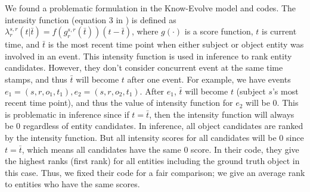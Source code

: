 We found a problematic formulation in the Know-Evolve model and codes.
The intensity function (equation 3 in \citep{Trivedi2017KnowEvolveDT}) is defined as 
$\lambda_r^{s,r}(t|\bar{t})=f(g_r^{s,r}(\bar{t}))(t-\bar{t})$, where $g(\cdot)$ is a score function, $t$ is current time, and $\bar{t}$ is the most recent time point when either subject or object entity was involved in an event.
This intensity function is used in inference to rank entity candidates.
However, they don't consider concurrent event at the same time stamps, and thus $\bar{t}$ will become $t$ after one event.
For example, we have events $e_1=(s,r,o_1, t_1), e_2=(s, r, o_2, t_1)$.
After $e_1$, $\bar{t}$ will become $t$ (subject $s$'s most recent time point), and thus the value of intensity function for $e_2$ will be 0.
This is problematic in inference since if $t=\bar{t}$, then the intensity function will always be 0 regardless of entity candidates. 
In inference, all object candidates are ranked by the intensity function.
But all intensity scores for all candidates will be 0 since $t=\bar{t}$, which means all candidates have the same 0 score.
In their code, they give the highest ranks (first rank) for all entities including the ground truth object in this case.
Thus, we fixed their code for a fair comparison; we give an average rank to entities who have the same scores.

